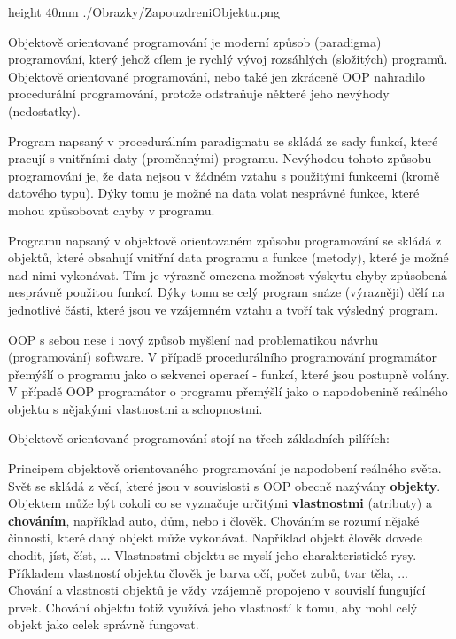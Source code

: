 

%

\pdfximage height 40mm {./Obrazky/ZapouzdreniObjektu.png}



\Obsah


Objektově orientované programování je moderní způsob (paradigma) programování, který jehož cílem je rychlý vývoj rozsáhlých (složitých) programů. Objektově orientované programování, nebo také jen zkráceně OOP nahradilo procedurální programování, protože odstraňuje některé jeho nevýhody (nedostatky). 

Program napsaný v procedurálním paradigmatu se skládá ze sady funkcí, které pracují s vnitřními daty (proměnnými) programu. Nevýhodou tohoto způsobu programování je, že data nejsou v žádném vztahu s použitými funkcemi (kromě datového typu). Dýky tomu je možné na data volat nesprávné funkce, které mohou způsobovat chyby v programu.

Programu napsaný v objektově orientovaném způsobu programování se skládá z objektů, které obsahují vnitřní data programu a funkce (metody), které je možné nad nimi vykonávat. Tím je výrazně omezena možnost výskytu chyby způsobená nesprávně použitou funkcí. Dýky tomu se celý program snáze (výrazněji) dělí na jednotlivé části, které jsou ve vzájemném vztahu a tvoří tak výsledný program. 

OOP s sebou nese i nový způsob myšlení nad problematikou návrhu (programování) software. V případě procedurálního programování programátor přemýšlí o programu jako o sekvenci operací - funkcí, které jsou postupně volány. V případě OOP programátor o programu přemýšlí jako o napodobenině reálného objektu s nějakými vlastnostmi a schopnostmi.

Objektově orientované programování stojí na třech základních pilířích:




Principem objektově orientovaného programování je napodobení reálného světa. Svět se skládá z věcí, které jsou v souvislosti s OOP obecně nazývány {\bf objekty}. Objektem může být cokoli co se vyznačuje určitými {\bf vlastnostmi} (atributy) a {\bf chováním}, například auto, dům, nebo i člověk. Chováním se rozumí nějaké činnosti, které daný objekt může vykonávat. Například objekt člověk dovede chodit, jíst, číst, ... Vlastnostmi objektu se myslí jeho charakteristické rysy. Příkladem vlastností objektu člověk je barva očí, počet zubů, tvar těla, ... Chování a vlastnosti objektů je vždy vzájemně propojeno v souvislí fungující prvek. Chování objektu totiž využívá jeho vlastností k tomu, aby mohl celý objekt jako celek správně fungovat. 

